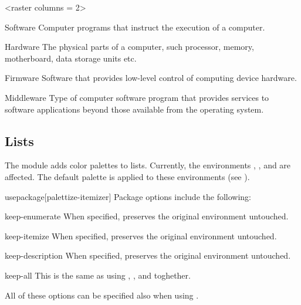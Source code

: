 \documentclass[a4paper, 11pt]{article}
\begin{document}
\begin{example}{}
    \begin{tcolorbox}[colback = black]
        \begin{PLTBoxEnumerate}
            <raster columns = 2>
            \item[Software] Computer programs that instruct the execution of a computer.
            \item[Hardware]The physical parts of a computer, such processor, memory, motherboard, data storage units etc.
            \item[Firmware] Software that provides low-level control of computing device hardware.
            \item[Middleware] Type of computer software program that provides services to software applications beyond those available from the operating system.
        \end{PLTBoxEnumerate}
    \end{tcolorbox}
\end{example}

\subsection{Lists}\label{sec:itemizer}

The module  adds color palettes to lists. Currently, the environments , , and  are affected. The default palette is applied to these environments (see ).

\begin{macro*}{usepackage}{}[palettize-itemizer]
    Package options include the following:

    \begin{option}{keep-enumerate}{}
        When specified,  preserves the original  environment untouched.
    \end{option}

    \begin{option}{keep-itemize}{}
        When specified,  preserves the original  environment untouched.
    \end{option}

    \begin{option}{keep-description}{}
        When specified,  preserves the original  environment untouched.
    \end{option}

    \begin{option}{keep-all}{}
        This is the same as using , , and  toghether.
    \end{option}

    All of these options can be specified also when using \latexinline{\usepackage{palettize}}.
\end{macro*}
\end{document}

